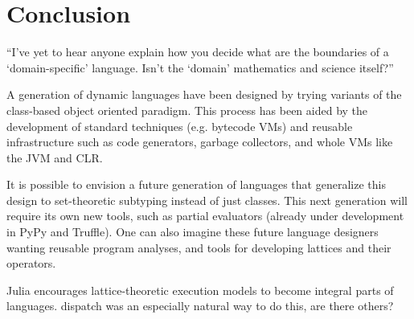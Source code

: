 \chapter{Conclusion}





``I've yet to hear anyone explain how you decide what are the boundaries of a `domain-specific' language. Isn't the `domain' mathematics and science itself?''~\cite{bobharperdsl}



A generation of dynamic languages have been designed by trying variants of
the class-based object oriented paradigm. This process has been aided by
the development of standard techniques (e.g. bytecode VMs) and reusable
infrastructure such as code generators, garbage collectors, and whole VMs
like the JVM and CLR.

It is possible to envision a future generation of languages that generalize
this design to set-theoretic subtyping instead of just classes. This next
generation will require its own new tools, such as partial evaluators (already
under development in PyPy and Truffle). One can also imagine these future
language designers wanting reusable program analyses, and tools for
developing lattices and their operators.


Julia encourages lattice-theoretic execution models to become integral
parts of languages. dispatch was an especially natural way to do this,
are there others?

